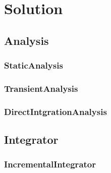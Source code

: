\documentclass[12pt]{article}
\begin{document}
\def\A{\mathop{\mbox{\huge \rm A}}\limits}
\def\I{\mathop{\cal {\bf I}}}
\def\U{{\bf U}}
\def\Ud{  \dot{\bf U}}
\def\Udd{  \ddot{\bf U}}
\def\F{{\bf F}}
\def\R{{\bf R}}
\def\K{{\bf K}}
\def\P{{\bf P}}
\def\B{{\bf B}}
\def\M{{\bf M}}
\def\f{{\bf F}}
\def\C{{\bf C}}
\def\D{{\bf D}}
\def\T{{\bf T}}
\def\X{{\bf X}}
\def\Q{{\bf Q}}
\def\V{{\bf V}}
\def\mylambda{{\bf \lambda}}
\def\myLambda{{\bf \Lambda}}
\def\myalpha{{\bf \alpha}}
\def\myPhi{{\bf \Phi}}
\def\zero{{\bf 0}}

\tableofcontents

\section{Solution}
\subsection{{\bf Analysis}}


\pagebreak \subsubsection{StaticAnalysis}


\pagebreak \subsubsection{{\bf TransientAnalysis}}


\pagebreak \subsubsection{DirectIntgrationAnalysis}


%

\pagebreak \subsection{{\bf Integrator}}


\pagebreak \subsubsection{{\bf IncrementalIntegrator}}

\end{document}
